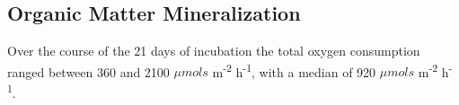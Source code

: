 \subsection{Organic Matter Mineralization}

Over the course of the 21 days of incubation the total oxygen consumption ranged between 360 and 2100 $\mu mols$ m\textsuperscript{-2} h\textsuperscript{-1}, with a median of 920 $\mu mols$ m\textsuperscript{-2} h\textsuperscript{-1}.  